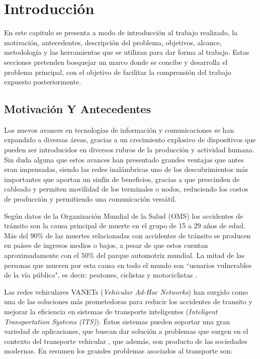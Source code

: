 \chapter{Introducción}
    En este capitulo se presenta a modo de introducción al trabajo realizado, la motivación, antecedentes, descripción del problema, objetivos, alcance, metodología y las herramientas que se utilizan para dar forma al trabajo. Estas secciones pretenden bosquejar un marco donde se concibe y desarrolla el problema principal, con el objetivo de facilitar la comprensión del trabajo expuesto posteriormente.
    
\section{Motivación Y Antecedentes}

Los nuevos avances en tecnologías de información y comunicaciones se han expandido a diversas áreas, gracias a un crecimiento explosivo de dispositivos que pueden ser introducidos en diversos rubros de la producción y actividad humana.  Sin duda alguna que estos avances han presentado grandes ventajas que antes eran impensadas, siendo las redes inalámbricas uno de los descubrimientos más importantes que aportan un sinfín de beneficios, gracias a que prescinden de cableado y permiten movilidad de los terminales o nodos, reduciendo los costos de producción y permitiendo una comunicación versátil. 

Según datos de la Organización Mundial de la Salud (OMS) los accidentes de tránsito son la causa principal de muerte en el grupo de 15 a 29 años de edad. Más del $90\%$ de las muertes relacionadas con accidentes de tránsito se producen en países de ingresos medios o bajos, a pesar de que estos cuentan aproximadamente con el $50\%$ del parque automotriz mundial. La mitad de las personas que mueren por esta causa en todo el mundo son ``usuarios vulnerables de la vía pública", es decir: peatones, ciclistas y motociclistas \cite{GSRRS}.

Las redes vehiculares VANETs (\textit{Vehicular Ad-Hoc Networks}) han surgido como una de las soluciones más prometedoras para reducir los accidentes de transito y mejorar la eficiencia en sistemas de transporte inteligentes (\textit{Inteligent Transportation Systems (ITS)}). Éstos sistemas pueden soportar una gran variedad de aplicaciones, que buscan dar solución a problemas que surgen en el contexto del transporte vehicular \cite{Bi2017}, que además, son producto de las sociedades modernas. En resumen los grandes problemas asociados al transporte son: 

